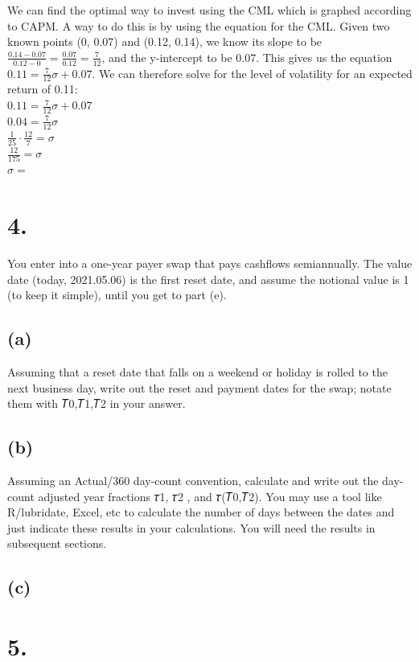 \documentclass{article}
\begin{document}
{We can find the optimal way to invest using the CML which is graphed according to CAPM. A way to do this is by using the equation for the CML. Given two known points (0, 0.07) and (0.12, 0.14), we know its slope to be $\frac{0.14-0.07}{0.12 - 0} = \frac{0.07}{0.12} = \frac{7}{12}$, and the y-intercept to be 0.07. This gives us the equation $0.11 = \frac{7}{12}\sigma + 0.07$. We can therefore solve for the level of volatility for an expected return of 0.11: \\
$0.11 = \frac{7}{12}\sigma + 0.07$ \\
$0.04 = \frac{7}{12}\sigma$ \\
$\frac{1}{25} \cdot \frac{12}{7} = \sigma$ \\
$\frac{12}{175} = \sigma$ \\
$\sigma = $ 

}

\section*{4.}
{\Large 

You enter into a one-year payer swap that pays cashflows semiannually. The value date (today, 2021.05.06) is the first reset date, and assume the notional value is 1 (to keep it simple), until you get to part (e).

\subsection*{(a)}
Assuming that a reset date that falls on a weekend or holiday is rolled to the next business day, write out the reset and payment dates for the swap; notate them with 𝑇0,𝑇1,𝑇2 in your answer.

\subsection*{(b)}

Assuming an Actual/360 day-count convention, calculate and write out the day-count adjusted year fractions 𝜏1, 𝜏2 , and 𝜏(𝑇0,𝑇2). You may use a tool like R/lubridate, Excel, etc to calculate the number of days between the dates and just indicate these results in your calculations. You will need the results in subsequent sections.

\subsection*{(c)}

}

\section*{5.}
{\Large 



}
\end{document}
